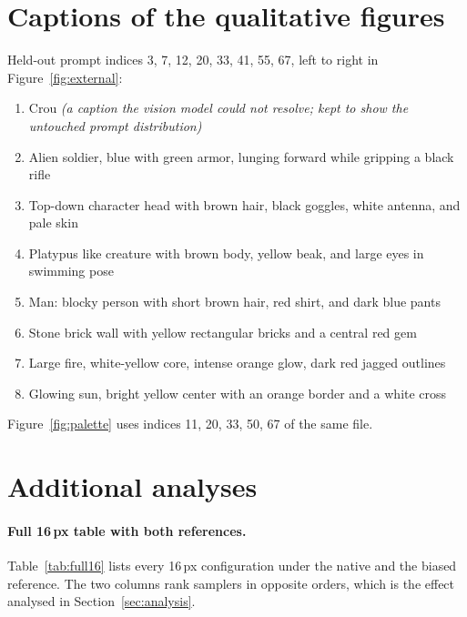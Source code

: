 \section{Captions of the qualitative figures}
\label{app:prompts}

Held-out prompt indices 3, 7, 12, 20, 33, 41, 55, 67, left to right in Figure~\ref{fig:external}:
\begin{enumerate}[leftmargin=1.6em,itemsep=0pt]
  \item Crou \emph{(a caption the vision model could not resolve; kept to show the untouched prompt distribution)}
  \item Alien soldier, blue with green armor, lunging forward while gripping a black rifle
  \item Top-down character head with brown hair, black goggles, white antenna, and pale skin
  \item Platypus like creature with brown body, yellow beak, and large eyes in swimming pose
  \item Man: blocky person with short brown hair, red shirt, and dark blue pants
  \item Stone brick wall with yellow rectangular bricks and a central red gem
  \item Large fire, white-yellow core, intense orange glow, dark red jagged outlines
  \item Glowing sun, bright yellow center with an orange border and a white cross
\end{enumerate}

Figure~\ref{fig:palette} uses indices 11, 20, 33, 50, 67 of the same file.

\section{Additional analyses}
\label{app:more}

\paragraph{Full 16\,px table with both references.}
Table~\ref{tab:full16} lists every 16\,px configuration under the native and the biased reference. The two columns rank
samplers in opposite orders, which is the effect analysed in Section~\ref{sec:analysis}.

